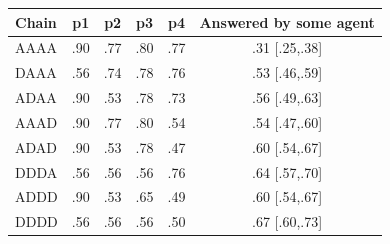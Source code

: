 \begin{tabular}{lccccc}\toprule
Chain & p1 & p2 & p3 & p4 & Answered by some agent\\\midrule
AAAA & .90 & .77 & .80 & .77 & .31 {\scriptsize[.25,.38]}\\
DAAA & .56 & .74 & .78 & .76 & .53 {\scriptsize[.46,.59]}\\
ADAA & .90 & .53 & .78 & .73 & .56 {\scriptsize[.49,.63]}\\
AAAD & .90 & .77 & .80 & .54 & .54 {\scriptsize[.47,.60]}\\
ADAD & .90 & .53 & .78 & .47 & .60 {\scriptsize[.54,.67]}\\
DDDA & .56 & .56 & .56 & .76 & .64 {\scriptsize[.57,.70]}\\
ADDD & .90 & .53 & .65 & .49 & .60 {\scriptsize[.54,.67]}\\
DDDD & .56 & .56 & .56 & .50 & .67 {\scriptsize[.60,.73]}\\
\bottomrule\end{tabular}
